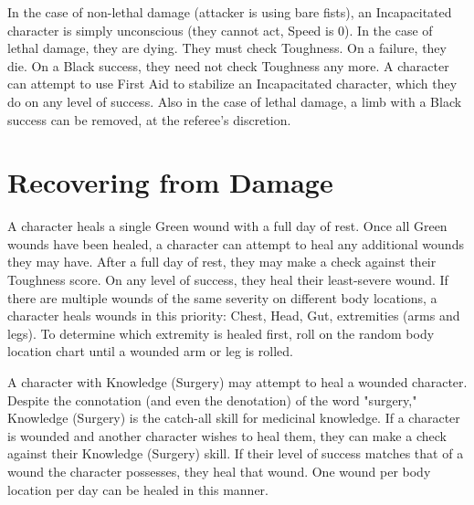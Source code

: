 \documentclass[oneside]{book}
\begin{document}
\begin{multicols}{2}
\begin{center}
\end{center}

In the case of non-lethal damage (attacker is using bare fists), an Incapacitated character is simply unconscious (they cannot act, Speed is 0). In the case of lethal damage, they are dying. They must check Toughness. On a failure, they die. On a Black success, they need not check Toughness any more. A character can attempt to use First Aid to stabilize an Incapacitated character, which they do on any level of success. Also in the case of lethal damage, a limb with a Black success can be removed, at the referee's discretion. 

\section{Recovering from Damage}
A character heals a single Green wound with a full day of rest. Once all Green wounds have been healed, a character can attempt to heal any additional wounds they may have. After a full day of rest, they may make a check against their Toughness score. On any level of success, they heal their least-severe wound. If there are multiple wounds of the same severity on different body locations, a character heals wounds in this priority: Chest, Head, Gut, extremities (arms and legs). To determine which extremity is healed first, roll on the random body location chart until a wounded arm or leg is rolled. 

A character with Knowledge (Surgery) may attempt to heal a wounded character. Despite the connotation (and even the denotation) of the word "surgery," Knowledge (Surgery) is the catch-all skill for medicinal knowledge. If a character is wounded and another character wishes to heal them, they can make a check against their Knowledge (Surgery) skill. If their level of success matches that of a wound the character possesses, they heal that wound. One wound per body location per day can be healed in this manner. 


\end{multicols}
\end{document}
